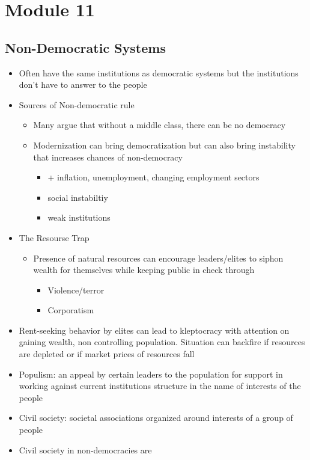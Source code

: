 \documentclass[11pt]{article}
\begin{document}
\section{Module 11}
\label{sec:org950fb9f}
\subsection{Non-Democratic Systems}
\label{sec:org16bc1b5}
\begin{itemize}
\item Often have the same institutions as democratic systems but the institutions don't have to answer to the people
\item Sources of Non-democratic rule
\begin{itemize}
\item Many argue that without a middle class, there can be no democracy
\item Modernization can bring democratization but can also bring instability that increases chances of non-democracy
\begin{itemize}
\item + inflation, unemployment, changing employment sectors
\item social instabiltiy
\item weak institutions
\end{itemize}
\end{itemize}
\item The Resourse Trap
\begin{itemize}
\item Presence of natural resources can encourage leaders/elites to siphon wealth for themselves while keeping public in check through
\begin{itemize}
\item Violence/terror
\item Corporatism
\end{itemize}
\end{itemize}
\item Rent-seeking behavior by elites can lead to kleptocracy with attention on gaining wealth, non controlling population. Situation can backfire if resources are depleted or if market prices of resources fall
\item Populism: an appeal by certain leaders to the population for support in working against current institutions structure in the name of interests of the people
\item Civil society: societal associations organized around interests of a group of people
\item Civil society in non-democracies are

\end{itemize}
\end{document}
